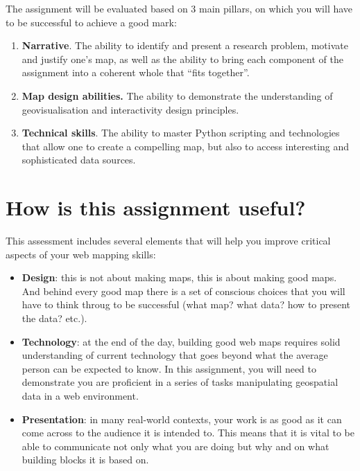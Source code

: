 \documentclass[
  letterpaper,
  DIV=11,
  numbers=noendperiod]{scrreprt}
\providecommand{\tightlist}{%
  \setlength{\itemsep}{0pt}\setlength{\parskip}{0pt}}\usepackage{longtable,booktabs,array}
\begin{document}

The assignment will be evaluated based on 3 main pillars, on which you
will have to be successful to achieve a good mark:

\begin{enumerate}
\def\labelenumi{\arabic{enumi}.}
\tightlist
\item
  \textbf{Narrative}. The ability to identify and present a research
  problem, motivate and justify one's map, as well as the ability to
  bring each component of the assignment into a coherent whole that
  ``fits together''.
\item
  \textbf{Map design abilities.} The ability to demonstrate the
  understanding of geovisualisation and interactivity design principles.
\item
  \textbf{Technical skills}. The ability to master Python scripting and
  technologies that allow one to create a compelling map, but also to
  access interesting and sophisticated data sources.
\end{enumerate}

\section*{How is this assignment
useful?}\label{how-is-this-assignment-useful}


This assessment includes several elements that will help you improve
critical aspects of your web mapping skills:

\begin{itemize}
\tightlist
\item
  \textbf{Design}: this is not about making maps, this is about making
  good maps. And behind every good map there is a set of conscious
  choices that you will have to think throug to be successful (what map?
  what data? how to present the data? etc.).
\item
  \textbf{Technology}: at the end of the day, building good web maps
  requires solid understanding of current technology that goes beyond
  what the average person can be expected to know. In this assignment,
  you will need to demonstrate you are proficient in a series of tasks
  manipulating geospatial data in a web environment.
\item
  \textbf{Presentation}: in many real-world contexts, your work is as
  good as it can come across to the audience it is intended to. This
  means that it is vital to be able to communicate not only what you are
  doing but why and on what building blocks it is based on.
\end{itemize}
\end{document}
